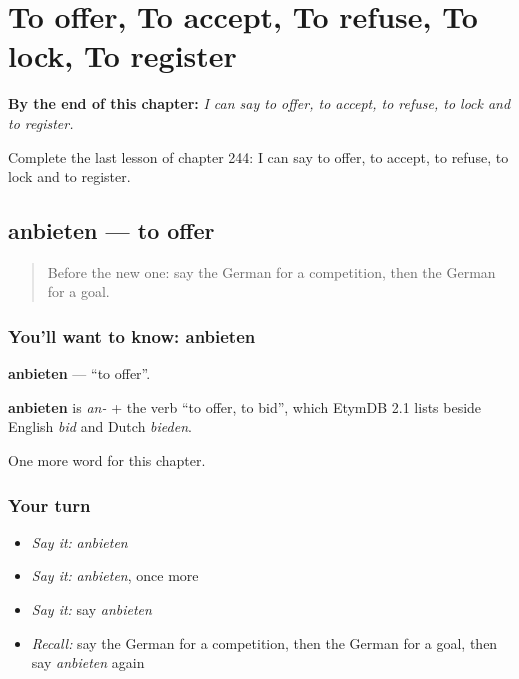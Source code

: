 
\chapter{To offer, To accept, To refuse, To lock, To register}
\label{ch:ge-to-offer-to-accept-to-refuse-to-lock-to-register}

\begin{chapteropening}
\textbf{By the end of this chapter:} \emph{I can say to offer, to accept, to refuse, to lock and to register.}

Complete the last lesson of chapter 244: I can say to offer, to accept, to refuse, to lock and to register.
\end{chapteropening}

\section[anbieten]{anbieten — to offer}

\label{lesson:GE-C244-anbieten}



\begin{quote}
Before the new one: say the German for a competition, then the German for a goal.
\end{quote}

\subsection*{You'll want to know: anbieten}
\textbf{anbieten} — \textquotedblleft{}to offer\textquotedblright{}.

\begin{cousinweb}
\textbf{anbieten} is \emph{an-} + the verb \textquotedblleft{}to offer, to bid\textquotedblright{}, which EtymDB 2.1 lists beside English \emph{bid} and Dutch \emph{bieden}.
\end{cousinweb}

\begin{grammarlens}[title={What you've built}]
One more word for this chapter.
\end{grammarlens}

\subsection*{Your turn}
\begin{itemize}
\raggedright
  \item \emph{Say it:} \emph{anbieten}
  \item \emph{Say it:} \emph{anbieten}, once more
  \item \emph{Say it:} say \emph{anbieten}
  \item \emph{Recall:} say the German for a competition, then the German for a goal, then say \emph{anbieten} again
\end{itemize}

